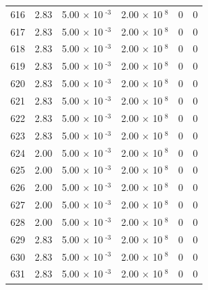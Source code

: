 \documentclass[a4paper,11pt]{article}
\begin{document}
\begin{center}
\begin{longtable}{|R{1.5cm}|R{2.4cm}|R{2.4cm}|R{2.4cm}|R{2.4cm}|R{2.4cm}|}
  616 &   2.83  &         5.00 $\times$ 10$^{\text{          -3}}$  &         2.00 $\times$ 10$^{\text{           8}}$  & 0  & 0 \\
  617 &   2.83  &         5.00 $\times$ 10$^{\text{          -3}}$  &         2.00 $\times$ 10$^{\text{           8}}$  & 0  & 0 \\
  618 &   2.83  &         5.00 $\times$ 10$^{\text{          -3}}$  &         2.00 $\times$ 10$^{\text{           8}}$  & 0  & 0 \\
  619 &   2.83  &         5.00 $\times$ 10$^{\text{          -3}}$  &         2.00 $\times$ 10$^{\text{           8}}$  & 0  & 0 \\
  620 &   2.83  &         5.00 $\times$ 10$^{\text{          -3}}$  &         2.00 $\times$ 10$^{\text{           8}}$  & 0  & 0 \\
  621 &   2.83  &         5.00 $\times$ 10$^{\text{          -3}}$  &         2.00 $\times$ 10$^{\text{           8}}$  & 0  & 0 \\
  622 &   2.83  &         5.00 $\times$ 10$^{\text{          -3}}$  &         2.00 $\times$ 10$^{\text{           8}}$  & 0  & 0 \\
  623 &   2.83  &         5.00 $\times$ 10$^{\text{          -3}}$  &         2.00 $\times$ 10$^{\text{           8}}$  & 0  & 0 \\
  624 &   2.00  &         5.00 $\times$ 10$^{\text{          -3}}$  &         2.00 $\times$ 10$^{\text{           8}}$  & 0  & 0 \\
  625 &   2.00  &         5.00 $\times$ 10$^{\text{          -3}}$  &         2.00 $\times$ 10$^{\text{           8}}$  & 0  & 0 \\
  626 &   2.00  &         5.00 $\times$ 10$^{\text{          -3}}$  &         2.00 $\times$ 10$^{\text{           8}}$  & 0  & 0 \\
  627 &   2.00  &         5.00 $\times$ 10$^{\text{          -3}}$  &         2.00 $\times$ 10$^{\text{           8}}$  & 0  & 0 \\
  628 &   2.00  &         5.00 $\times$ 10$^{\text{          -3}}$  &         2.00 $\times$ 10$^{\text{           8}}$  & 0  & 0 \\
  629 &   2.83  &         5.00 $\times$ 10$^{\text{          -3}}$  &         2.00 $\times$ 10$^{\text{           8}}$  & 0  & 0 \\
  630 &   2.83  &         5.00 $\times$ 10$^{\text{          -3}}$  &         2.00 $\times$ 10$^{\text{           8}}$  & 0  & 0 \\
  631 &   2.83  &         5.00 $\times$ 10$^{\text{          -3}}$  &         2.00 $\times$ 10$^{\text{           8}}$  & 0  & 0 \\

\end{longtable}
\end{center}
\end{document}
